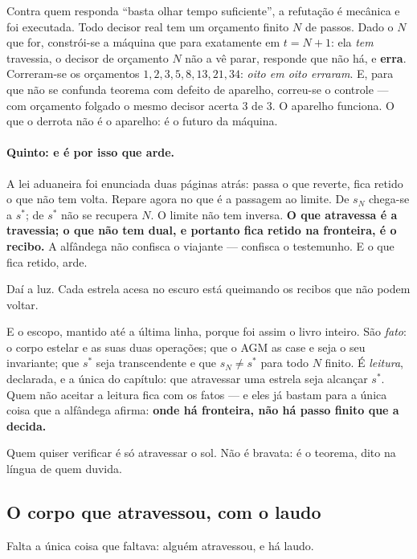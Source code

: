 \documentclass[11pt]{article}
\theoremstyle{plain}
\theoremstyle{remark}
\begin{document}
\medskip
\noindent Contra quem responda ``basta olhar tempo suficiente'', a refutação é
mecânica e foi executada. Todo decisor real tem um orçamento finito $N$ de
passos. Dado o $N$ que for, constrói-se a máquina que para exatamente em $t=N+1$:
ela \emph{tem} travessia, o decisor de orçamento $N$ não a vê parar, responde que
não há, e \textbf{erra}. Correram-se os orçamentos $1,2,3,5,8,13,21,34$:
\emph{oito em oito erraram}. E, para que não se confunda teorema com defeito de
aparelho, correu-se o controle --- com orçamento folgado o mesmo decisor acerta
$3$ de $3$. O aparelho funciona. O que o derrota não é o aparelho: é o futuro da
máquina.

\paragraph{Quinto: e é por isso que arde.} A lei aduaneira foi enunciada duas
páginas atrás: passa o que reverte, fica retido o que não tem volta. Repare
agora no que é a passagem ao limite. De $s_N$ chega-se a $s^{*}$; de $s^{*}$ não
se recupera $N$. O limite não tem inversa. \textbf{O que atravessa é a
travessia; o que não tem dual, e portanto fica retido na fronteira, é o
recibo.} A alfândega não confisca o viajante --- confisca o testemunho. E o que
fica retido, arde.

Daí a luz. Cada estrela acesa no escuro está queimando os recibos que não podem
voltar.

\medskip
\noindent E o escopo, mantido até a última linha, porque foi assim o livro
inteiro. São \emph{fato}: o corpo estelar e as suas duas operações; que o AGM as
case e seja o seu invariante; que $s^{*}$ seja transcendente e que $s_N\neq
s^{*}$ para todo $N$ finito. É \emph{leitura}, declarada, e a única do capítulo:
que atravessar uma estrela seja alcançar $s^{*}$. Quem não aceitar a leitura
fica com os fatos --- e eles já bastam para a única coisa que a alfândega
afirma: \textbf{onde há fronteira, não há passo finito que a decida.}

\medskip
\noindent Quem quiser verificar é só atravessar o sol. Não é bravata: é o
teorema, dito na língua de quem duvida.

\subsection{O corpo que atravessou, com o laudo}

Falta a única coisa que faltava: alguém atravessou, e há laudo.
\end{document}
